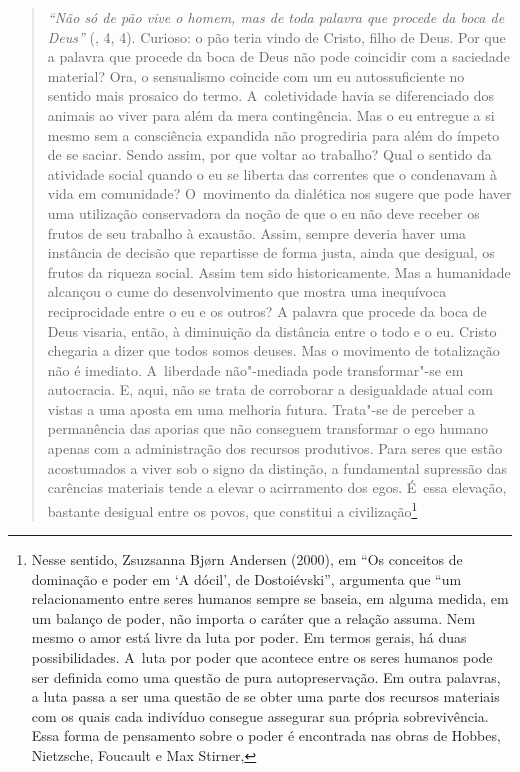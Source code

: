 {\begin{quote}
\emph{``Não só de pão vive o homem, mas de toda palavra que procede da
boca de Deus''} (, 4, 4). Curioso: o pão teria vindo de Cristo,
filho de Deus. Por que a palavra que procede da boca de Deus não pode
coincidir com a saciedade material? Ora, o sensualismo coincide com um
eu autossuficiente no sentido mais prosaico do termo. A~coletividade
havia se diferenciado dos animais ao viver para além da mera
contingência. Mas o eu entregue a si mesmo sem a consciência expandida
não progrediria para além do ímpeto de se saciar. Sendo assim, por que
voltar ao trabalho? Qual o sentido da atividade social quando o eu se
liberta das correntes que o condenavam à vida em comunidade? O~movimento
da dialética nos sugere que pode haver uma utilização conservadora da
noção de que o eu não deve receber os frutos de seu trabalho à exaustão.
Assim, sempre deveria haver uma instância de decisão que repartisse de
forma justa, ainda que desigual, os frutos da riqueza social. Assim tem
sido historicamente. Mas a humanidade alcançou o cume do desenvolvimento
que mostra uma inequívoca reciprocidade entre o eu e os outros? A
palavra que procede da boca de Deus visaria, então, à diminuição da
distância entre o todo e o eu. Cristo chegaria a dizer que todos somos
deuses. Mas o movimento de totalização não é imediato. A~liberdade
não"-mediada pode transformar"-se em autocracia. E, aqui, não se trata de
corroborar a desigualdade atual com vistas a uma aposta em uma melhoria
futura. Trata"-se de perceber a permanência das aporias que não conseguem
transformar o ego humano apenas com a administração dos recursos
produtivos. Para seres que estão acostumados a viver sob o signo da
distinção, a fundamental supressão das carências materiais tende a
elevar o acirramento dos egos. É~essa elevação, bastante desigual entre
os povos, que constitui a civilização\footnote{Nesse sentido, Zsuzsanna
  Bjørn Andersen (2000), em ``Os conceitos de dominação e poder em `A
  dócil', de Dostoiévski'', argumenta que ``um relacionamento entre
  seres humanos sempre se baseia, em alguma medida, em um balanço de
  poder, não importa o caráter que a relação assuma. Nem mesmo o amor
  está livre da luta por poder. Em termos gerais, há duas
  possibilidades. A~luta por poder que acontece entre os seres humanos
  pode ser definida como uma questão de pura autopreservação. Em outra
  palavras, a luta passa a ser uma questão de se obter uma parte dos
  recursos materiais com os quais cada indivíduo consegue assegurar sua
  própria sobrevivência. Essa forma de pensamento sobre o poder é
  encontrada nas obras de Hobbes, Nietzsche, Foucault e Max Stirner,
}
\end{quote}}
